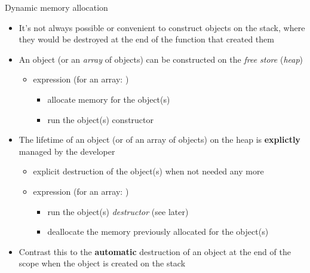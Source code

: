 \begin{frame}{Dynamic memory allocation}

  \begin{itemize}
  \item<1-> It's not always possible or convenient to construct objects on the
    stack, where they would be destroyed at the end of the function that created
    them
  \item<2-> An object (or an \textit{array} of objects) can be constructed on
    the \textit{free store} (\textit{heap})
    \begin{itemize}
    \item {} expression (for an array: )
      \begin{itemize}
      \item allocate memory for the object(s)
      \item run the object(s) constructor
      \end{itemize}
    \end{itemize}
  \item<3-> The lifetime of an object (or of an array of objects) on the heap is
    \textbf{explictly} managed by the developer
    \begin{itemize}
    \item explicit destruction of the object(s) when not needed any more
    \item {} expression (for an array: )
      \begin{itemize}
      \item run the object(s) \textit{destructor} (see later)
      \item deallocate the memory previously allocated for the object(s)
      \end{itemize}
    \end{itemize}
  \item<4-> Contrast this to the \textbf{automatic} destruction of an object at
    the end of the scope when the object is created on the stack
  \end{itemize}

\end{frame}

